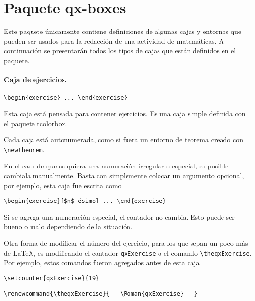 \documentclass[11pt]{article}
\begin{document}
\section{Paquete \textsf{qx-boxes}}

Este paquete únicamente contiene definiciones de algunas cajas y entornos que pueden ser usados para la redacción de una actividad de matemáticas. A continuación se presentarán todos los tipos de cajas que están definidos en el paquete.


\paragraph{Caja de ejercicios.} \verb|\begin{exercise} ... \end{exercise}|

\begin{exercise}
  Esta caja está pensada para contener ejercicios. Es una caja simple definida con el paquete \textsf{tcolorbox}.
\end{exercise}


\begin{exercise}
  Cada caja está autonumerada, como si fuera un entorno de teorema creado con \verb|\newtheorem|.
\end{exercise}


\begin{exercise}[$n$-ésimo]
  En el caso de que se quiera una numeración irregular o especial, es posible cambiala manualmente. Basta con simplemente colocar un argumento opcional, por ejemplo, esta caja fue escrita como
    
  \verb|\begin{exercise}[$n$-ésimo] ... \end{exercise}|  
\end{exercise}

\begin{exercise}
  Si se agrega una numeración especial, el contador no cambia. Esto puede ser bueno o malo dependiendo de la situación.
\end{exercise}


\setcounter{qxExercise}{19}
\renewcommand{\theqxExercise}{---\Roman{qxExercise}---}

\begin{exercise}
  Otra forma de modificar el número del ejercicio, para los que sepan un poco más de \LaTeX, es modificando el contador \texttt{qxExercise} o el comando \verb|\theqxExercise|. Por ejemplo, estos comandos fueron agregados antes de esta caja

  \verb|\setcounter{qxExercise}{19}|

  \verb|\renewcommand{\theqxExercise}{---\Roman{qxExercise}---}|
\end{exercise}
\end{document}
